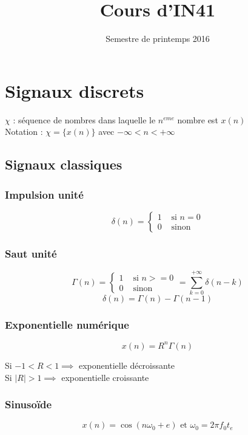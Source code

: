 \documentclass[a4paper,12pt]{article}
\title{Cours d'IN41}{Chapitre 7 -- Signaux et systèmes discrets}
\author{}
\date{Semestre de printemps 2016}
\begin{document}
\maketitlepage

\tableofcontents
\pagebreak

\section{Signaux discrets}

$\chi$ : séquence de nombres dans laquelle le $n^{eme}$ nombre est $x(n)$ \\
Notation : $\chi = \{ x(n) \}$ avec $-\infty < n < +\infty$

\subsection{Signaux classiques}

\subsubsection{Impulsion unité}

\[ \delta(n) = \begin{cases}
    1 & \text{ si } n = 0 \\
    0 & \text{ sinon}
\end{cases} \]

\subsubsection{Saut unité}

\[ \Gamma(n) = \begin{cases}
    1 & \text{ si } n >= 0 \\
    0 & \text{ sinon}
\end{cases} = \sum_{k=0}^{+\infty} \delta(n-k) \]
\[ \delta(n) = \Gamma(n) - \Gamma(n-1) \]

\subsubsection{Exponentielle numérique}

\[ x(n) = R^n \Gamma(n) \]

Si $-1 < R < 1 \implies$ exponentielle décroissante \\
Si $|R| > 1 \implies$ exponentielle croissante

\subsubsection{Sinusoïde}

\[ x(n) = \cos(n\omega_0 + e) \text{ et } \omega_0 = 2\pi f_0 t_e \]
\end{document}
